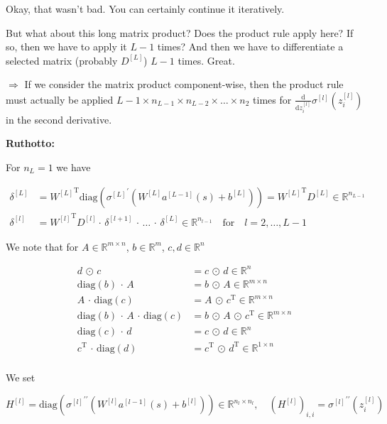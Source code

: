 Okay, that wasn't bad. You can certainly continue it iteratively. 

But what about this long matrix product? Does the product rule apply here? If so, then we have to apply it $L-1$ times? And then we have to differentiate a selected matrix (probably $D^{[L]}$) $L-1$ times. Great.

$\Rightarrow$ If we consider the matrix product component-wise, then the product rule must actually be applied $L-1 \times n_{L-1} \times n_{L-2} \times \ldots \times n_{2}$ times for $\frac{\mathrm{d}}{\mathrm{d} z^{[l]}_i} \sigma^{[l]}(z^{[l]}_i)$ in the second derivative.  

\textbf{Ruthotto:}

For $n_L = 1$ we have

\begin{align*}
    \delta^{[L]} & = {W^{[L]}}^{\mathrm{T}} \mathrm{diag}({\sigma^{[L]}}^{\prime}(W^{[L]} a^{[L-1]}(s) + b^{[L]})) = {W^{[L]}}^{\mathrm{T}} D^{[L]} \in \mathbb{R}^{n_{L-1}} \\
    \delta^{[l]} & = {W^{[l]}}^{\mathrm{T}} D^{[l]} \cdot \, \delta^{[l+1]} \, \cdot \, \ldots \,  \cdot \, \delta^{[L]} \in \mathbb{R}^{n_{l-1}} \quad \text{for} \quad l = 2, \ldots, L-1
\end{align*}

We note that for $A \in \mathbb{R}^{m \times n}$, $b \in \mathbb{R}^{m}$, $c, d \in \mathbb{R}^{n}$

\begin{align*}
    d \, \odot \, c &= c \, \odot \, d \in \mathbb{R}^{n} \\
    \mathrm{diag}(b) \, \cdot \, A &= b \, \odot \, A \in \mathbb{R}^{m \times n} \\
    A \, \cdot \, \mathrm{diag}(c) &= A \, \odot \, c^{\mathrm{T}} \in \mathbb{R}^{m \times n} \\
    \mathrm{diag}(b) \, \cdot \, A \, \cdot \, \mathrm{diag}(c) &= b \, \odot \, A \, \odot \, c^{\mathrm{T}} \in \mathbb{R}^{m \times n} \\
    \mathrm{diag}(c) \, \cdot \, d &= c \, \odot \, d \in \mathbb{R}^{n} \\
    c^{\mathrm{T}} \, \cdot \, \mathrm{diag}(d) &= c^{\mathrm{T}} \, \odot \, d^{\mathrm{T}} \in \mathbb{R}^{1 \times n} \\
\end{align*}

We set 

\begin{equation*}
    H^{[l]} = \mathrm{diag}({\sigma^{[l]}}^{\prime \prime}(W^{[l]} a^{[l-1]}(s) + b^{[l]})) \in \mathbb{R}^{n_l \times n_l}, \quad (H^{[l]})_{i, i} = {\sigma^{[l]}}^{\prime \prime} (z_{i}^{[l]})
\end{equation*}

